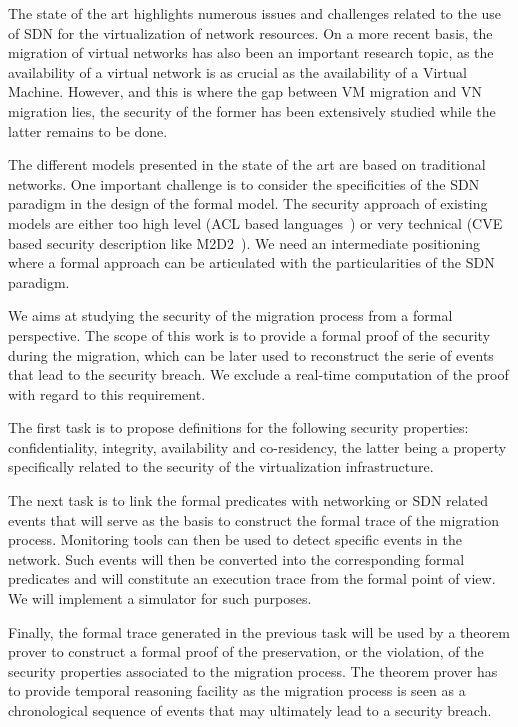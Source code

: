 The state of the art highlights numerous issues and challenges related to the use of SDN for the virtualization of network resources.
On a more recent basis, the migration of virtual networks has also been an important research topic, as the availability of a virtual network is as crucial as the availability of a Virtual Machine.
However, and this is where the gap between VM migration and VN migration lies, the security of the former has been extensively studied while the latter remains to be done.

The different models presented in the state of the art are based on traditional networks.
One important challenge is to consider the specificities of the SDN paradigm in the design of the formal model.
The security approach of existing models are either too high level (ACL based languages~\cite{orbac,mulval-Ou2013}) or very technical (CVE based security description like M2D2~\cite{M2D2-Morin2002}).
We need an intermediate positioning where a formal approach can be articulated with the particularities of the SDN paradigm.

We aims at studying the security of the migration process from a formal perspective.
The scope of this work is to provide a formal proof of the security during the migration, which can be later used to reconstruct the serie of events that lead to the security breach. We exclude a real-time computation of the proof with regard to this requirement.

The first task is to propose definitions for the following security properties: confidentiality, integrity, availability 
and co-residency, the latter being a property specifically related to the security of the virtualization infrastructure.

The next task is to link the formal predicates with networking or SDN related events that will serve as the basis to construct the formal trace of the migration process.
Monitoring tools can then be used to detect specific events in the network. Such events will then be converted into the corresponding formal predicates and will constitute an execution trace from the formal point of view.
We will implement a simulator for such purposes.

Finally, the formal trace generated in the previous task will be used by a theorem prover to construct a formal proof of the preservation, or the violation, of the security properties associated to the migration process. The theorem prover has to provide temporal reasoning facility as the migration process is seen as a chronological sequence of events that may ultimately lead to a security breach.

